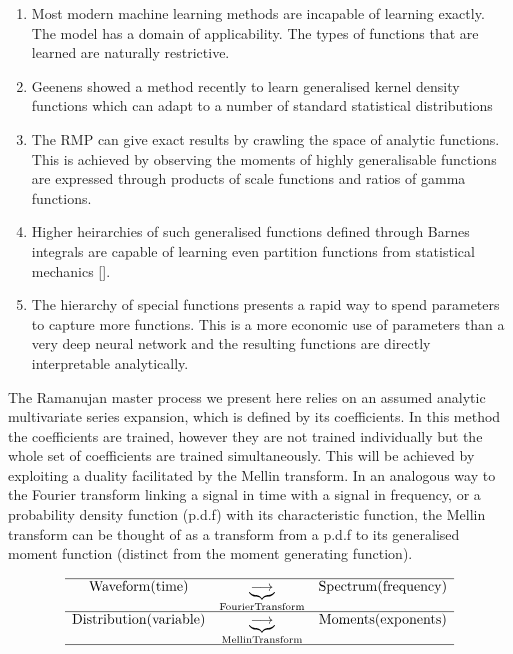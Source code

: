 \documentclass[journal=jcisd8,manuscript=article,layout=onecolumn,pdftex,floatfix,amsmath,amssymb,10pt]{achemso}
\begin{document}
\begin{enumerate}
\item Most modern machine learning methods are incapable of learning exactly. The model has a domain of applicability. The types of functions that are learned are naturally restrictive.
\item Geenens \cite{Geenens2017} showed a method recently to learn generalised kernel density functions which can adapt to a number of standard statistical distributions
\item The RMP can give exact results by crawling the space of analytic functions. This is achieved by observing the moments of highly generalisable functions are expressed through products of scale functions and ratios of gamma functions.
\item Higher heirarchies of such generalised functions defined through Barnes integrals are capable of learning even partition functions from statistical mechanics [\cite{I function}].
\item The hierarchy of special functions presents a rapid way to spend parameters to capture more functions. This is a more economic use of parameters than a very deep neural network and the resulting functions are directly interpretable analytically.
\end{enumerate}

The Ramanujan master process we present here relies on an assumed analytic multivariate series expansion, which is defined by its coefficients. In this method the coefficients are trained, however they are not trained individually but the whole set of coefficients are trained simultaneously. This will be achieved by exploiting a duality facilitated by the Mellin transform. In an analogous way to the Fourier transform linking a signal in time with a signal in frequency, or a probability density function (p.d.f) with its characteristic function, the Mellin transform can be thought of as a transform from a p.d.f to its generalised moment function (distinct from the moment generating function). \par

\begin{equation}
\begin{matrix}
\hline
\mathrm{Waveform}(\mathrm{time}) & \underbrace{\longrightarrow}_{\mathrm{Fourier Transform}} & \mathrm{Spectrum}(\mathrm{frequency})\\
\hline
\mathrm{Distribution}(\mathrm{variable}) & \underbrace{\longrightarrow}_{\mathrm{Mellin Transform}} & \mathrm{Moments}(\mathrm{exponents}) \\
\hline
\end{matrix}
\end{equation}
\end{document}

